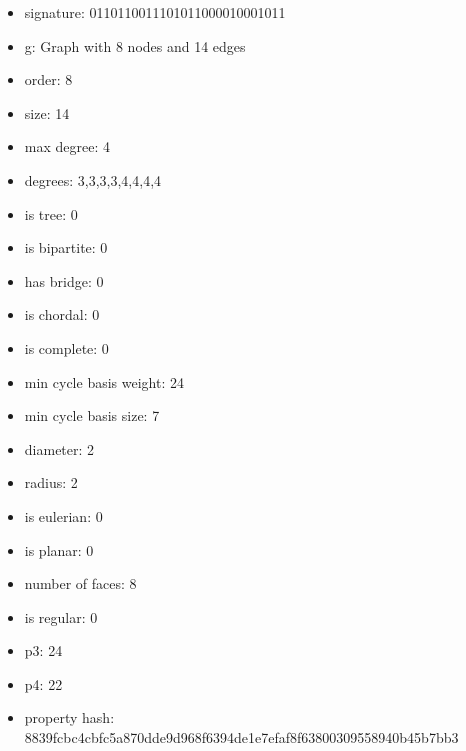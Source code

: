 \begin{itemize}
\item signature: 0110110011101011000010001011
\item g: Graph with 8 nodes and 14 edges
\item order: 8
\item size: 14
\item max degree: 4
\item degrees: 3,3,3,3,4,4,4,4
\item is tree: 0
\item is bipartite: 0
\item has bridge: 0
\item is chordal: 0
\item is complete: 0
\item min cycle basis weight: 24
\item min cycle basis size: 7
\item diameter: 2
\item radius: 2
\item is eulerian: 0
\item is planar: 0
\item number of faces: 8
\item is regular: 0
\item p3: 24
\item p4: 22
\item property hash: 8839fcbc4cbfc5a870dde9d968f6394de1e7efaf8f63800309558940b45b7bb3
\end{itemize}
\newpage
\begin{figure}
\end{figure}

